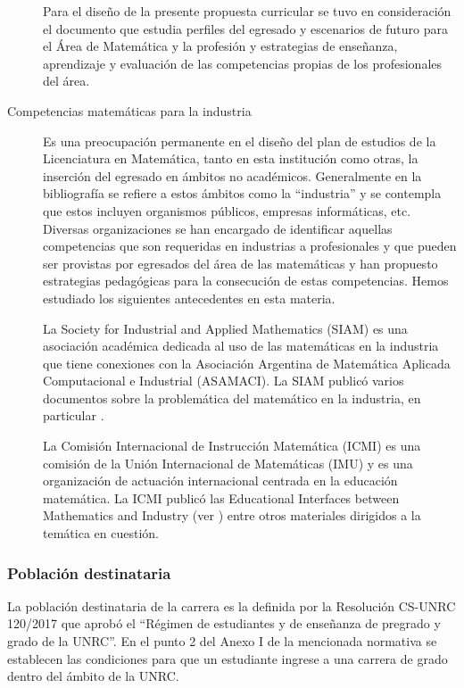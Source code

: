 \documentclass[a4paper, 12pt]{article}
\begin{document}
\begin{description}
Para el diseño de la presente propuesta curricular se tuvo en consideración el documento \cite{paniagua2013educacion} 
que estudia perfiles del egresado y escenarios de futuro para el Área de Matemática y la profesión y estrategias de enseñanza, aprendizaje y evaluación de las competencias propias de los profesionales del área. 

\item[Competencias matemáticas para la industria] 
Es una preocupación permanente en el diseño del plan de estudios de la Licenciatura en Matemática, tanto en esta institución como otras, la inserción del egresado en ámbitos no académicos. Generalmente  en la bibliografía se refiere a estos ámbitos como la ``industria'' y  se contempla que estos incluyen organismos públicos, empresas informáticas, etc. Diversas organizaciones se han encargado de identificar aquellas competencias que son requeridas en industrias a profesionales y que pueden ser provistas por egresados del área de las matemáticas y han propuesto estrategias pedagógicas para la consecución de estas competencias. Hemos estudiado los siguientes antecedentes en esta materia.

La Society for Industrial and Applied Mathematics (SIAM)  es una asociación académica dedicada al uso de las matemáticas en la industria que tiene conexiones con la Asociación Argentina de Matemática Aplicada Computacional e Industrial (ASAMACI). La SIAM publicó varios documentos sobre la problemática del matemático en la industria, en particular \cite{society1996siam,society2012siam}.


 La Comisión Internacional de Instrucción Matemática (ICMI) es una comisión de la Unión Internacional de Matemáticas (IMU) y es una organización de actuación internacional centrada en la educación matemática. La ICMI publicó las Educational Interfaces between Mathematics and Industry (ver \cite{damlamian2013educational}) entre otros materiales dirigidos a la temática en cuestión.
\end{description}



\subsubsection{Población destinataria}

La población destinataria de la carrera es la definida por la Resolución CS-UNRC 120/2017 que aprobó el ``Régimen  de estudiantes y de enseñanza de pregrado y grado de la UNRC''. En el punto 2 del Anexo I de la mencionada normativa se establecen las condiciones para que un estudiante ingrese a una carrera de grado dentro del ámbito de la UNRC.
\end{document}
